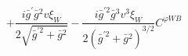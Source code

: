 %
\begin{dmath*}
%
  +  \frac{i {\bar g}^\prime {\bar g}{}^2 v \xi_W}{2 \sqrt{{\bar g}^{\prime 2} + {\bar g}{}^2}}   -  \frac{i {\bar g}^{\prime 2} {\bar g}{}^3 v^3 \xi_W}{2 \left({\bar g}^{\prime 2} + {\bar g}{}^2\right)^{3/2}}C^{ \varphi  WB}
%
\end{dmath*}
%
